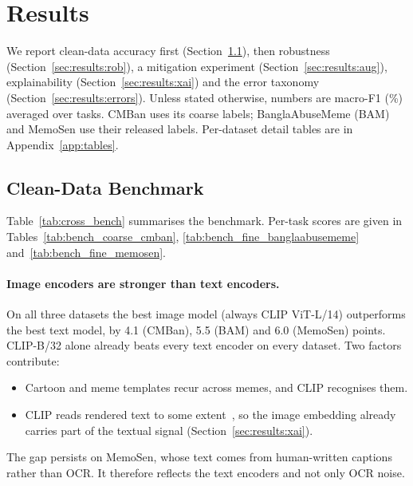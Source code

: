 \section{Results}
\label{sec:results}

We report clean-data accuracy first (Section~\ref{sec:results:benchmark}), then robustness
(Section~\ref{sec:results:rob}), a mitigation experiment (Section~\ref{sec:results:aug}), explainability
(Section~\ref{sec:results:xai}) and the error taxonomy (Section~\ref{sec:results:errors}). Unless stated otherwise,
numbers are macro-F1 (\%) averaged over tasks. CMBan uses its coarse labels; BanglaAbuseMeme (BAM) and MemoSen use
their released labels. Per-dataset detail tables are in Appendix~\ref{app:tables}.

\subsection{Clean-Data Benchmark}
\label{sec:results:benchmark}



Table~\ref{tab:cross_bench} summarises the benchmark. Per-task scores are given in
Tables~\ref{tab:bench_coarse_cmban}, \ref{tab:bench_fine_banglaabusememe} and~\ref{tab:bench_fine_memosen}.

\paragraph{Image encoders are stronger than text encoders.} On all three datasets the best image model (always CLIP
ViT-L/14) outperforms the best text model, by 4.1 (CMBan), 5.5 (BAM) and 6.0 (MemoSen) points. CLIP-B/32 alone
already beats every text encoder on every dataset. Two factors contribute:
\begin{itemize}
  \item Cartoon and meme templates recur across memes, and CLIP recognises them.
  \item CLIP reads rendered text to some extent~\cite{goh2021multimodal}, so the image embedding already carries part
  of the textual signal (Section~\ref{sec:results:xai}).
\end{itemize}
The gap persists on MemoSen, whose text comes from human-written captions rather than OCR. It therefore reflects
the text encoders and not only OCR noise.

